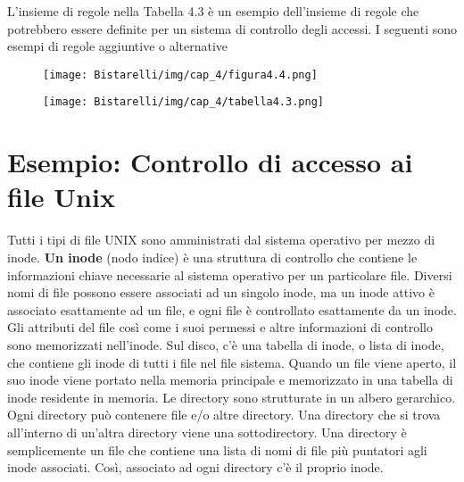 \singlespacing

L'insieme di regole nella Tabella 4.3 è un esempio dell'insieme di regole che potrebbero essere definite per un sistema di controllo degli accessi. I seguenti sono esempi di regole aggiuntive o alternative

\begin{figure}[H]
	\centering
    \texttt{[image: Bistarelli/img/cap\_4/figura4.4.png]}
\end{figure}

\begin{figure}[H]
	\centering
    \texttt{[image: Bistarelli/img/cap\_4/tabella4.3.png]}
\end{figure}
\section{Esempio: Controllo di accesso ai file Unix}
Tutti i tipi di file UNIX sono amministrati dal sistema operativo per mezzo di inode.
\singlespacing
\textbf{Un inode} (nodo indice) è una struttura di controllo che contiene le informazioni chiave necessarie al sistema operativo per un particolare file. Diversi nomi di file possono essere associati ad un singolo inode, ma un inode attivo è associato esattamente ad un file, e ogni file è controllato esattamente da un inode. Gli attributi del file così come i suoi permessi e altre informazioni di controllo sono memorizzati nell'inode. Sul disco, c'è una tabella di inode, o lista di inode, che contiene gli inode di tutti i file nel file sistema. Quando un file viene aperto, il suo inode viene portato nella memoria principale e memorizzato in una tabella di inode residente in memoria.
\singlespacing
Le directory sono strutturate in un albero gerarchico. Ogni directory può contenere file e/o altre directory. Una directory che si trova all'interno di un'altra directory viene una sottodirectory. Una directory è semplicemente un file che contiene una lista di nomi di file più puntatori agli inode associati. Così, associato ad ogni directory c'è il proprio inode.
